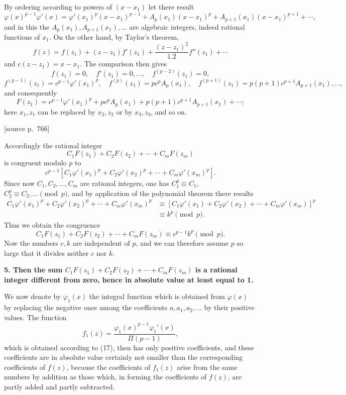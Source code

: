 \documentclass[11pt]{article}
\newcommand{\srcpage}[1]{\par\medskip\noindent\textsf{[source p.~#1]}\par\smallskip}
\begin{document}
By ordering according to powers of $(x-x_1)$ let there result
\[
\varphi(x)^{p-1}\varphi'(x)=
\varphi'(x_1)^p(x-x_1)^{p-1}
+A_p(x_1)(x-x_1)^p
+A_{p+1}(x_1)(x-x_1)^{p+1}+\cdots,
\]
and in this the $A_p(x_1),A_{p+1}(x_1),\ldots$ are algebraic integers, indeed rational functions of $x_1$. On the other hand, by Taylor's theorem,
\[
f(z)=f(z_1)+(z-z_1)f'(z_1)+\frac{(z-z_1)^2}{1.2}f''(z_1)+\cdots
\]
and $c(z-z_1)=x-x_1$. The comparison then gives
\[
f(z_1)=0,\quad f'(z_1)=0,\ldots,\quad f^{(p-2)}(z_1)=0,
\]
\[
f^{(p-1)}(z_1)=c^{p-1}\varphi'(x_1)^p,\quad
f^{(p)}(z_1)=pc^pA_p(x_1),\quad
f^{(p+1)}(z_1)=p(p+1)c^{p+1}A_{p+1}(x_1),\ldots,
\]
and consequently
\[
F(z_1)=c^{p-1}\varphi'(x_1)^p+pc^pA_p(x_1)+p(p+1)c^{p+1}A_{p+1}(x_1)+\cdots;
\]
here $x_1,z_1$ can be replaced by $x_2,z_2$ or by $x_3,z_3$, and so on.

\srcpage{766}
Accordingly the rational integer
\[
C_1F(z_1)+C_2F(z_2)+\cdots+C_mF(z_m)
\]
is congruent modulo $p$ to
\[
c^{p-1}\left[C_1\varphi'(x_1)^p+C_2\varphi'(x_2)^p+\cdots+C_m\varphi'(x_m)^p\right].
\]
Since now $C_1,C_2,\ldots,C_m$ are rational integers, one has $C_1^p\equiv C_1$, $C_2^p\equiv C_2,\ldots\pmod p$, and by application of the polynomial theorem there results
\[
\begin{aligned}
C_1\varphi'(x_1)^p+C_2\varphi'(x_2)^p+\cdots+C_m\varphi'(x_m)^p
&\equiv
\left[C_1\varphi'(x_1)+C_2\varphi'(x_2)+\cdots+C_m\varphi'(x_m)\right]^p\\
&\equiv k^p \pmod p.
\end{aligned}
\]
Thus we obtain the congruence
\begin{equation}\tag{18}
C_1F(z_1)+C_2F(z_2)+\cdots+C_mF(z_m)\equiv c^{p-1}k^p\pmod p.
\end{equation}
Now the numbers $c,k$ are independent of $p$, and we can therefore assume $p$ so large that it divides neither $c$ nor $k$.

\textbf{5. Then the sum $C_1F(z_1)+C_2F(z_2)+\cdots+C_mF(z_m)$ is a rational integer different from zero, hence in absolute value at least equal to 1.}

We now denote by $\varphi_1(x)$ the integral function which is obtained from $\varphi(x)$ by replacing the negative ones among the coefficients $a,a_1,a_2,\ldots$ by their positive values. The function
\[
f_1(z)=\frac{\varphi_1(x)^{p-1}\varphi_1'(x)}{\Pi(p-1)},
\]
which is obtained according to (17), then has only positive coefficients, and these coefficients are in absolute value certainly not smaller than the corresponding coefficients of $f(z)$, because the coefficients of $f_1(z)$ arise from the same numbers by addition as those which, in forming the coefficients of $f(z)$, are partly added and partly subtracted.
\end{document}
